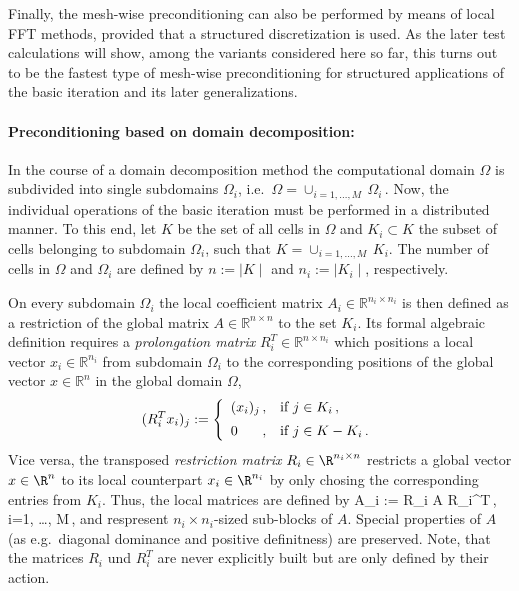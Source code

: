 Finally, the mesh-wise preconditioning can also be performed by means of local FFT methods, provided that a structured discretization is used. As the later test calculations will show, among the variants considered here so far, this turns out to be the fastest type of mesh-wise preconditioning for structured applications of the basic iteration and its later generalizations. 

\paragraph{Preconditioning based on domain decomposition:}
\label{SEC_SCARC_block_precon}

In the course of a domain decomposition method the computational domain $\Omega$ is subdivided into single subdomains $\Omega_i$, i.e.\ 
$\Omega=\cup_{i=1, \dots, M} \,\Omega_i\,$. Now, the individual operations of the basic iteration must be performed in a distributed manner.
%
To this end, let $K$ be the set of all cells in $\Omega$ and $K_i \subset K$ the subset of cells belonging to subdomain $\Omega_i$, such that $K=\cup_{i=1, \dots, M}\, K_i$.
The number of cells in $\Omega$ and $\Omega_i$ are defined by $n := \mid\!\! K \!\!\mid$ 
and $n_i := \mid\!\! K_i \!\!\mid$, respectively.

On every subdomain $\Omega_i$ the local coefficient matrix $A_i \in \mathbb{R}^{n_i \times n_i}$ is
then defined as a restriction of the global matrix $A \in \mathbb{R}^{n \times n}$ to the
set $K_i$.  %
%
Its formal algebraic definition requires a {\it prolongation matrix} $R_i^T \in \mathbb{R}^{n \times n_i}$ which
positions a local vector $x_i \in \mathbb{R}^{n_i}$ from subdomain $\Omega_i$ 
to the corresponding positions of the global vector $x \in \mathbb{R}^n$ in the global domain $\Omega$,%
\[
(R_i^T x_i)_j :=
 \left\{
  \begin{array}{l@{\,, \quad }l}
   (x_i)_j & \mbox{if $j \in K_i  \,,$} \\[1.2ex]
   0       & \mbox{if $j \in K-K_i\,.$} 
  \end{array}
 \right.
\]
Vice versa, the transposed {\it restriction matrix} $R_i \in \R^{n_i \times n}$ restricts a global vector $x\in \R^n$ to its local counterpart $x_i \in \R^{n_i}$ by only chosing the corresponding entries from $K_i$.  
Thus, the local matrices are defined by
\be
A_i := R_i A R_i^T\,, \qquad i=1, \ldots, M\,,
\label{EQ_SCARC_subdomain_matrices}
\ee
and respresent $n_i \!\times\! n_i$-sized sub-blocks of $A$. Special properties of $A$ (as e.g.\ diagonal dominance and positive definitness) are preserved. Note, that the matrices $R_i$ und $R_i^T$ are never explicitly built but are only defined by their action.

